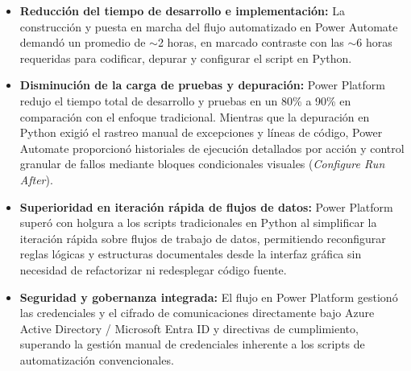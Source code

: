 \begin{itemize}
    \item \textbf{Reducción del tiempo de desarrollo e implementación:} La construcción y puesta en marcha del flujo automatizado en Power Automate demandó un promedio de $\sim$2 horas, en marcado contraste con las $\sim$6 horas requeridas para codificar, depurar y configurar el script en Python.
    \item \textbf{Disminución de la carga de pruebas y depuración:} Power Platform redujo el tiempo total de desarrollo y pruebas en un 80\% a 90\% en comparación con el enfoque tradicional. Mientras que la depuración en Python exigió el rastreo manual de excepciones y líneas de código, Power Automate proporcionó historiales de ejecución detallados por acción y control granular de fallos mediante bloques condicionales visuales (\textit{Configure Run After}).
    \item \textbf{Superioridad en iteración rápida de flujos de datos:} Power Platform superó con holgura a los scripts tradicionales en Python al simplificar la iteración rápida sobre flujos de trabajo de datos, permitiendo reconfigurar reglas lógicas y estructuras documentales desde la interfaz gráfica sin necesidad de refactorizar ni redesplegar código fuente.
    \item \textbf{Seguridad y gobernanza integrada:} El flujo en Power Platform gestionó las credenciales y el cifrado de comunicaciones directamente bajo Azure Active Directory / Microsoft Entra ID y directivas de cumplimiento, superando la gestión manual de credenciales inherente a los scripts de automatización convencionales.
\end{itemize}

